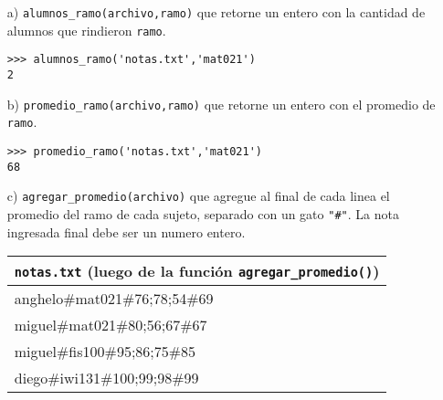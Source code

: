 \begin{itemize}
    \item[a)] \texttt{alumnos\_ramo(archivo,ramo)} que retorne un entero con la cantidad de alumnos que rindieron \texttt{ramo}.
    
    \begin{lstlisting}[style=consola]
>>> alumnos_ramo('notas.txt','mat021')
2
    \end{lstlisting}
    
    \item[b)] \texttt{promedio\_ramo(archivo,ramo)} que retorne un entero con el promedio de \texttt{ramo}.
    
        \begin{lstlisting}[style=consola]
>>> promedio_ramo('notas.txt','mat021')
68
    \end{lstlisting}
    
    \item[c)] \texttt{agregar\_promedio(archivo)} que agregue al final de cada linea el promedio del ramo de cada sujeto, separado con un gato \texttt{"\#"}. La nota ingresada final debe ser un numero entero.
    
    
\begin{center}


\begin{tabular}{|l|}
    \hline
    \texttt{notas.txt} (luego de la función \texttt{agregar\_promedio()}) \\
    \hline
    anghelo\#mat021\#76;78;54\#69 \\
    miguel\#mat021\#80;56;67\#67 \\
    miguel\#fis100\#95;86;75\#85 \\
    diego\#iwi131\#100;99;98\#99 \\
    \hline
\end{tabular}
\end{center}


\end{itemize}
